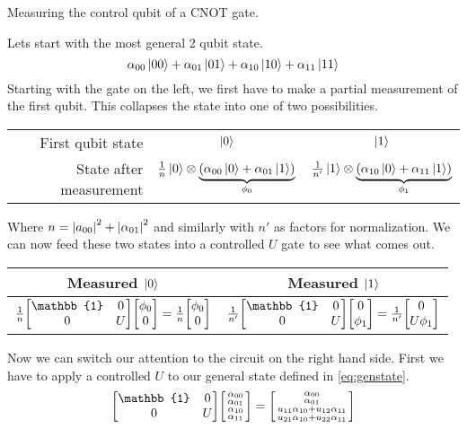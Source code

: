 \documentclass[boxes,pages]{homework}
\begin{document}
\begin{problem}
Measuring the control qubit of a CNOT gate.
\end{problem}

\begin{solution}
	Lets start with the most general 2 qubit state.
	\begin{equation}\label{eq:genstate}
		\alpha_{00}\ket{00} + \alpha_{01}\ket{01} + \alpha_{10}\ket{10} + \alpha_{11}\ket{11}
	\end{equation}
	Starting with the gate on the left, we first have to make a partial measurement of the first qubit. This collapses the state into one of two possibilities.
	\begin{center}
		\begin{tabular}{ r c | c }
			First qubit state       & $\ket{0}$                                                                                      & $\ket{1}$                                                                                       \\
			State after measurement & $\frac{1}{n}\ket{0}\otimes\underbrace{\qty(\alpha_{00}\ket{0} + \alpha_{01}\ket{1})}_{\phi_0}$ & $\frac{1}{n'}\ket{1}\otimes\underbrace{\qty(\alpha_{10}\ket{0} + \alpha_{11}\ket{1})}_{\phi_1}$
		\end{tabular}
	\end{center}
	Where $n = \abs{a_{00}}^2 + \abs{\alpha_{01}}^2$ and similarly with $n'$ as factors for normalization. We can now feed these two states into a controlled $U$ gate to see what comes out.
	\begin{center}
		\begin{tabular}{c@{\hskip 0.75in} c}
			Measured $\ket{0}$ & Measured $\ket{1}$ \\ \toprule
			$\frac{1}{n}\mqty[\mathbb{1} & 0 \\ 0 & U]\mqty[\phi_0 \\ 0] = \frac{1}{n}\mqty[\phi_0 \\ 0]$ & $\frac{1}{n'}\mqty[\mathbb{1} & 0 \\ 0 & U]\mqty[0 \\ \phi_1] = \frac{1}{n'}\mqty[0 \\ U\phi_1]$
		\end{tabular}
	\end{center}
	Now we can switch our attention to the circuit on the right hand side. First we have to apply a controlled $U$ to our general state defined in \cref{eq:genstate}.
	\begin{equation*}
		\mqty[\mathbb{1} & 0 \\ 0 & U]\smqty[\alpha_{00} \\ \alpha_{01} \\ \alpha_{10} \\ \alpha_{11}] = \smqty[\alpha_{00} \\ \alpha_{01} \\ u_{11}\alpha_{10} + u_{12}\alpha_{11} \\ u_{21}\alpha_{10} + u_{22}\alpha_{11}]

\end{equation*}
\end{solution}
\end{document}
